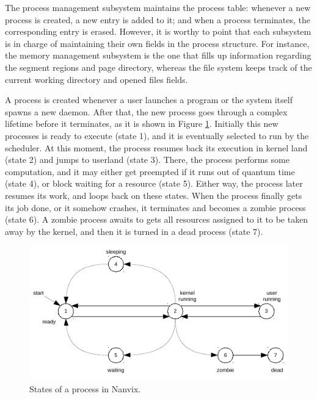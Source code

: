 \documentclass[10pt,a4paper]{article}
\begin{document}
\begin{table}[h]
\begin{tabular}{l l l}
	\bottomrule
\end{tabular}
\end{table}

The process management subsystem maintains the process table: whenever a new process is created, a new entry is added to it; and when a process terminates, the corresponding entry is erased. However, it is worthy to point that each subsystem is in charge of maintaining their own fields in the process structure. For instance, the memory management subsystem is the one that fills up information regarding the segment regions and page directory, whereas the file system keeps track of the current working directory and opened files fields.

A process is created whenever a user launches a program or the system itself spawns a new daemon. After that, the new process goes through a complex lifetime before it terminates, as it is shown in Figure \ref{figure: states of a process in nanvix}. Initially this new processes is ready to execute (state 1), and it is eventually selected to run by the scheduler. At this moment, the process resumes back its execution in kernel land (state 2) and jumps to userland (state 3). There, the process performs some computation, and it may either get preempted if it runs out of quantum time (state 4), or block waiting for a resource (state 5). Either way, the process later resumes its work, and loops back on these states. When the process finally gets its job done, or it somehow crashes, it terminates and becomes a zombie process (state 6). A zombie process awaits to gets all resources assigned to it to be taken away by the kernel, and then it is turned in a dead process (state 7).

\begin{figure}[t]
	\centering
	\includegraphics[scale=1.4]{img/process-states}
	\caption{States of a process in Nanvix.}
	\label{figure: states of a process in nanvix}
\end{figure}
\end{document}
